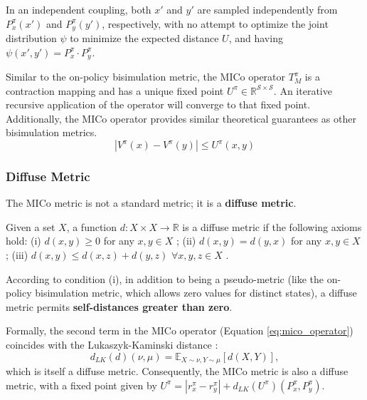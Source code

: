In an independent coupling, both $x'$ and $y'$ are sampled independently from $P_x^\pi(x')$ and $P_y^\pi(y')$, respectively, with no attempt to optimize the joint distribution $\psi$ to minimize the expected distance $U$, and having $\psi(x',y') = P_x^\pi \cdot P_y^\pi$.

Similar to the on-policy bisimulation metric, the MICo operator $T^\pi_M$ is a contraction mapping and has a unique fixed point $U^\pi \in \mathbb{R}^{\mathcal{S} \times \mathcal{S}}$. An iterative recursive application of the operator will converge to that fixed point. Additionally, the MICo operator provides similar theoretical guarantees as other bisimulation metrics.
\begin{equation}
    | V^\pi(x) -V^\pi(y) | \leq U^\pi(x,y)
\end{equation}

\subsubsection{Diffuse Metric}

The MICo metric is not a standard metric; it is a \textbf{diffuse metric}.

\begin{definition} 
\label{def:diffuse_metric}
    Given a set $X$, a function $d : X \times X \rightarrow \mathbb{R}$ is a diffuse metric if the following axioms hold: (i) $d(x, y) \geq 0$ for any $x, y \in X$ ; (ii) $d(x, y) = d(y, x)$ for any $x, y \in X$ ; (iii) $d(x, y) \leq d(x, z) + d(y, z)$ $\forall x, y, z \in X$ .
\end{definition}

According to condition (i), in addition to being a pseudo-metric (like the on-policy bisimulation metric, which allows zero values for distinct states), a diffuse metric permits \textbf{self-distances greater than zero}.

Formally, the second term in the MICo operator (Equation \ref{eq:mico_operator}) coincides with the Lukaszyk-Kaminski distance \cite{lukaszyk2004new}:
\begin{equation}
    d_{LK}(d)(\nu, \mu) = \mathbb{E}_{X \sim \nu, Y \sim \mu}[d(X,Y)],
\end{equation}
which is itself a diffuse metric. Consequently, the MICo metric is also a diffuse metric, with a fixed point given by $U^\pi = |r^\pi_x - r^\pi_y | + d_{LK}(U^\pi)(P^\pi_x, P^\pi_y)$.


